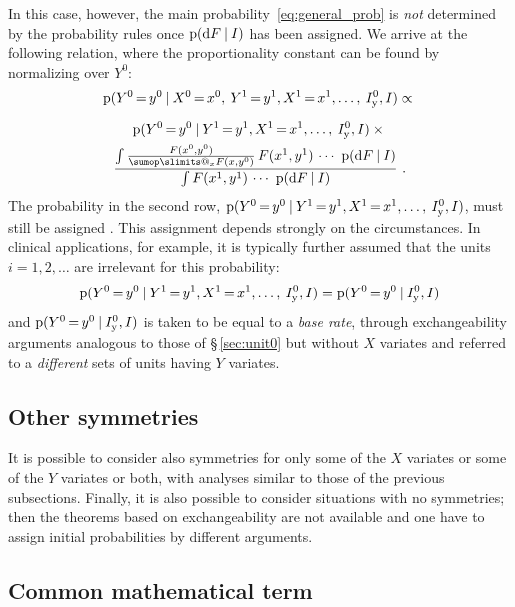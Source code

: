 \documentclass[\ifafour a4paper,12pt,\else a5paper,10pt,\fi%
onecolumn,oneside,article,%
british%
]{memoir}
\makeatletter
\theoremstyle{remark}
\theoremstyle{innote}
\def\sum{\DOTSI\sumop\slimits@}
\newcommand*{\di}{\mathrm{d}}%
\newcommand*{\p}{\mathrm{p}}%
\renewcommand*{\|}[1][]{\nonscript\:#1\vert\nonscript\:\mathopen{}}
\newcommand*{\mo}[1][=]{\mathord{\,#1\,}}
\newcommand*{\sect}{\S}%
\newcommand*{\Iy}{I_{\textrm{y}}}
\makeatother
\begin{document}
  In this case, however, the main probability~\eqref{eq:general_prob} is \emph{not} determined by the probability rules once $\p(\di F\|I)$ has been assigned. We arrive at the following relation, where the proportionality constant can be found by normalizing over $Y^{0}$:
\begin{multline}
  \label{eq:relation_exchY}
  \p(Y^{0}\mo y^{0} \|
  X^{0}\mo x^{0},\: Y^{1}\mo y^{1},X^{1}\mo x^{1},\dotsc,\: \Iy^{0},I)
  \propto
{}\\[2\jot]
  \p(Y^{0}\mo y^{0} \|
  Y^{1}\mo y^{1},X^{1}\mo x^{1},\dotsc,\: \Iy^{0},I) \times{}\\
  \frac{
    \int \frac{F(x^{0},y^{0})}{\sum_{x}F(x,y^{0})}\, F(x^{1},y^{1})\,\dotsm\  \p(\di F \|I)
  }{
    \int F(x^{1},y^{1})\,\dotsm\  \p(\di F \|I)
  } \ .
\end{multline}
The probability in the second row, $\p(Y^{0}\mo y^{0} \| Y^{1}\mo y^{1},X^{1}\mo x^{1},\dotsc,\: \Iy^{0},I)$, must still be assigned \autocites{lindleyetal1981}. This assignment depends strongly on the circumstances. In clinical applications, for example, it is typically further assumed that the units $i=1,2,\dotsc$ are irrelevant for this probability:
\begin{equation}
  \label{eq:indepYfromdata}
    \p(Y^{0}\mo y^{0} \|
  Y^{1}\mo y^{1},X^{1}\mo x^{1},\dotsc,\: \Iy^{0},I) =
    \p(Y^{0}\mo y^{0} \| \Iy^{0},I)
\end{equation}
and $\p(Y^{0}\mo y^{0} \| \Iy^{0},I)$ is taken to be equal to a \emph{base rate}\autocites{barhillel1980,jennyetal2018,sprengeretal2021,matthews1996}, through exchangeability arguments analogous to those of \sect\,\ref{sec:unit0} but without $X$ variates and referred to a \emph{different} sets of units having $Y$ variates.

\subsection{Other symmetries}
\label{sec:other_symm}

It is possible to consider also symmetries for only some of the $X$ variates or some of the $Y$ variates or both, with analyses similar to those of the previous subsections. Finally, it is also possible to consider situations with no symmetries; then the theorems based on exchangeability are not available and one have to assign initial probabilities by different arguments.

\subsection{Common mathematical term}
\label{sec:common_term}
\end{document}
